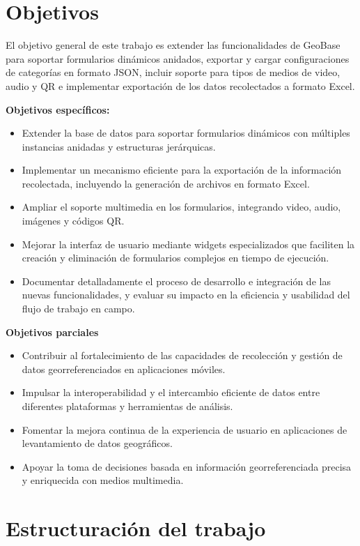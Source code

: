 \documentclass[12pt, a4paper]{book}
\begin{document}
\section{Objetivos}\label{objetivos}

El objetivo general de este trabajo es extender las funcionalidades de GeoBase para soportar formularios dinámicos anidados, exportar y cargar configuraciones de categorías en formato JSON, incluir soporte para tipos de medios de video, audio y QR e implementar exportación de los datos recolectados a formato Excel.

\textbf{Objetivos específicos:}
\begin{itemize}
    \item Extender la base de datos para soportar formularios dinámicos con múltiples instancias anidadas y estructuras jerárquicas.
    \item Implementar un mecanismo eficiente para la exportación de la información recolectada, incluyendo la generación de archivos en formato Excel.
    \item Ampliar el soporte multimedia en los formularios, integrando video, audio, imágenes y códigos QR.
    \item Mejorar la interfaz de usuario mediante widgets especializados que faciliten la creación y eliminación de formularios complejos en tiempo de ejecución.
    \item Documentar detalladamente el proceso de desarrollo e integración de las nuevas funcionalidades, y evaluar su impacto en la eficiencia y usabilidad del flujo de trabajo en campo.
\end{itemize}


\textbf{Objetivos parciales}
\begin{itemize}
    \item Contribuir al fortalecimiento de las capacidades de recolección y gestión de datos georreferenciados en aplicaciones móviles.
    \item Impulsar la interoperabilidad y el intercambio eficiente de datos entre diferentes plataformas y herramientas de análisis.
    \item Fomentar la mejora continua de la experiencia de usuario en aplicaciones de levantamiento de datos geográficos.
    \item Apoyar la toma de decisiones basada en información georreferenciada precisa y enriquecida con medios multimedia.
\end{itemize}

\section{Estructuración del
trabajo}\label{estructuraciuxf3n-del-trabajo}
\end{document}
